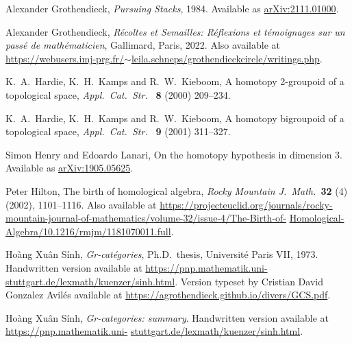 \documentclass[reqno]{amsart}
\theoremstyle{definition}
\begin{document}
\begin{thebibliography}{99}
Alexander Grothendieck, \textsl{Pursuing Stacks}, 1984.  Available as
\href{https://arxiv.org/abs/2111.01000}{arXiv:2111.01000}.

Alexander Grothendieck, \textsl{R\'ecoltes et Semailles: R\'eflexions et t\'emoignages sur un pass\'e de math\'ematicien}, Gallimard, Paris, 2022.  Also available at 
\href{https://webusers.imj-prg.fr/~leila.schneps/grothendieckcircle/writings.php}{https://webusers.imj-prg.fr/$\sim$leila.schneps/grothendieckcircle/writings.php}.

K.\ A.\ Hardie, K.\ H.\ Kamps and R.\ W.\ Kieboom, A homotopy 2-groupoid of a topological space, \textsl{Appl.\ Cat.\ Str.\ } \textbf{8} (2000) 209--234.

K.\ A.\ Hardie, K.\ H.\ Kamps and R.\ W.\ Kieboom, A homotopy
bigroupoid of a topological space, \textsl{Appl.\ Cat.\ Str.\ } \textbf{9} 
(2001) 311--327.

Simon Henry and Edoardo Lanari, On the homotopy hypothesis in dimension 3.  Available as \href{https://arxiv.org/abs/1905.05625}{arXiv:1905.05625}.

Peter Hilton, The birth of homological algebra, \textsl{Rocky Mountain J.\ Math.\ }\textbf{32} (4) (2002), 1101--1116.  Also available at \href{https://projecteuclid.org/journals/rocky-mountain-journal-of-mathematics/volume-32/issue-4/The-Birth-of-Homological-Algebra/10.1216/rmjm/1181070011.full}{https://projecteuclid.org/journals/rocky-mountain-journal-of-mathematics/volume-32/issue-4/The-Birth-of-} \hfill \break \href{https://projecteuclid.org/journals/rocky-mountain-journal-of-mathematics/volume-32/issue-4/The-Birth-of-Homological-Algebra/10.1216/rmjm/1181070011.full}{Homological-Algebra/10.1216/rmjm/1181070011.full}.

Ho\`ang Xu\^an S\'inh, \textsl{Gr-cat\'egories}, Ph.D.\ thesis, Universit\'e Paris VII, 1973.  Handwritten version available at
\href{https://pnp.mathematik.uni-stuttgart.de/lexmath/kuenzer/sinh.html}{https://pnp.mathematik.uni-stuttgart.de/lexmath/kuenzer/sinh.html}.  Version typeset by
Cristian David Gonzalez Avil\'es available at \href{https://agrothendieck.github.io/divers/GCS.pdf}{https://agrothendieck.github.io/divers/GCS.pdf}.

Ho\`ang Xu\^an S\'inh, \textsl{Gr-categories: summary}.  Handwritten version available at
 \href{https://pnp.mathematik.uni-stuttgart.de/lexmath/kuenzer/sinh.html}{https://pnp.mathematik.uni-} \hfill \break \href{https://pnp.mathematik.uni-stuttgart.de/lexmath/kuenzer/sinh.html}{stuttgart.de/lexmath/kuenzer/sinh.html}.


\end{thebibliography}
\end{document}
